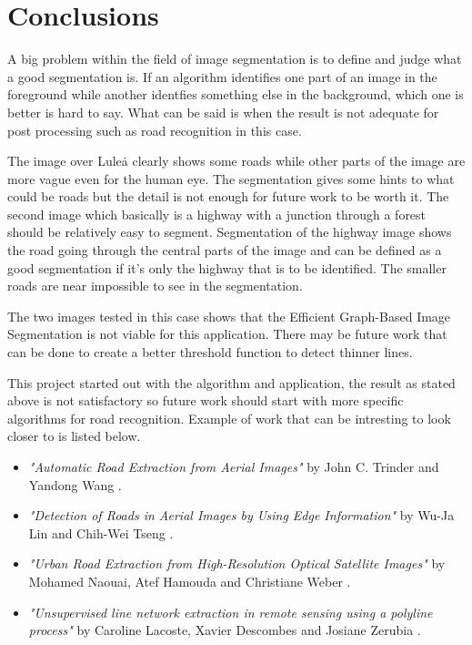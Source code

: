 \section{Conclusions}
A big problem within the field of image segmentation is to define and judge
what a good segmentation is. If an algorithm identifies one part of an image
in the foreground while another identfies something else in the background, which
one is better is hard to say. What can be said is when the result is not adequate
for post processing such as road recognition in this case.

The image over Lule\.{a} clearly shows some roads while other parts of the
image are more vague even for the human eye. The segmentation gives some hints
to what could be roads but the detail is not enough for future work to be worth it.
The second image which basically is a highway with a junction through a forest
should be relatively easy to segment. Segmentation of the highway image shows
the road going through the central parts of the image and can be defined as
a good segmentation if it's only the highway that is to be identified. The smaller
roads are near impossible to see in the segmentation.

The two images tested in this case shows that the Efficient Graph-Based Image Segmentation
is not viable for this application. There may be future work that can be done
to create a better threshold function to detect thinner lines.

This project started out with the algorithm and application, the result as stated
above is not satisfactory so future work should start with more specific algorithms
for road recognition. Example of work that can be intresting to look closer to
is listed below.
\begin{itemize}
  \item {\em "Automatic Road Extraction from Aerial Images"} by John C. Trinder and
Yandong Wang \cite{trinder1998}.
  \item {\em "Detection of Roads in Aerial Images by
Using Edge Information"} by Wu-Ja Lin and Chih-Wei Tseng \cite{lin2012}.
  \item {\em "Urban Road Extraction from High-Resolution Optical Satellite Images"} by
Mohamed Naouai, Atef Hamouda and Christiane Weber \cite{naouai2010}.
  \item {\em "Unsupervised line network extraction in remote sensing using a polyline
      process"} by Caroline Lacoste, Xavier Descombes and Josiane Zerubia \cite{lacoste2009}.
\end{itemize}

